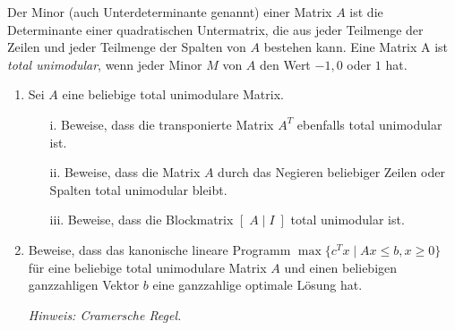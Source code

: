 \documentclass{uebung_cs}
\begin{document}
\begin{aufgabe}
	Der Minor (auch Unterdeterminante genannt) einer Matrix $A$ ist die Determinante einer quadratischen Untermatrix, die aus jeder Teilmenge der Zeilen und jeder Teilmenge der Spalten von $A$ bestehen kann. Eine Matrix A ist \emph{total unimodular}, wenn jeder Minor $M$ von $A$ den Wert $-1,0$ oder $1$ hat.
	\begin{enumerate}
		\item Sei $A$ eine beliebige total unimodulare Matrix.
		\begin{enumerate}
			\item[i.] Beweise, dass die transponierte Matrix $A^T$ ebenfalls total unimodular ist.
			\item[ii.] Beweise, dass die Matrix $A$ durch das Negieren beliebiger Zeilen oder Spalten total unimodular bleibt.
			\item[iii.] Beweise, dass die Blockmatrix $[\;A\;|\;I\;]$ total unimodular ist.
		\end{enumerate}
		\item Beweise, dass das kanonische lineare Programm $\max\{c^T x  \; | \; Ax \leq b, x \geq 0\}$ für eine beliebige total unimodulare Matrix $A$ und einen beliebigen ganzzahligen Vektor $b$ eine ganzzahlige optimale Lösung hat.

		\emph{Hinweis: Cramersche Regel.}
	\end{enumerate}
	
\end{aufgabe}
\end{document}
